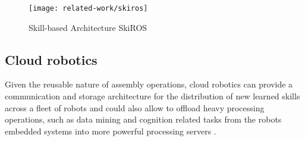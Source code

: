 \begin{figure}[H]
	\centering
	\texttt{[image: related-work/skiros]}
	\caption[Skill-based Architecture SkiROS]{Skill-based Architecture SkiROS \cite{Holz2015}}
	\label{fig:skiros}
\end{figure}





\subsection{Cloud robotics}

Given the reusable nature of assembly operations, cloud robotics can provide a communication and storage architecture for the distribution of new learned skills across a fleet of robots \cite{Tenorth2013,Stenmark2015T} and could also allow to offload heavy processing operations, such as data mining \cite{Witten2005} and cognition related tasks \cite{Beetz2010,Tenorth2013k,Saxena2014,Beetz2015} from the robots embedded systems into more powerful processing servers \cite{Hunziker2013}.

